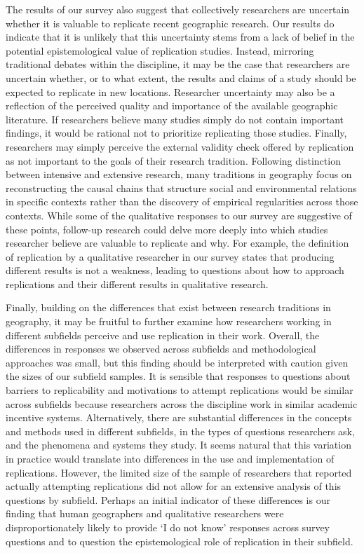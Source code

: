 \documentclass[]{interact}
\theoremstyle{plain}%
\theoremstyle{definition}
\theoremstyle{remark}
\begin{document}
The results of our survey also suggest that collectively researchers are uncertain whether it is valuable to replicate recent geographic research. 
Our results do indicate that it is unlikely that this uncertainty stems from a lack of belief in the potential epistemological value of replication studies.
Instead, mirroring traditional debates within the discipline, it may be the case that researchers are uncertain whether, or to what extent, the results and claims of a study should be expected to replicate in new locations. 
Researcher uncertainty may also be a reflection of the perceived quality and importance of the available geographic literature. 
If researchers believe many studies simply do not contain important findings, it would be rational not to prioritize replicating those studies.
Finally, researchers may simply perceive the external validity check offered by replication as not important to the goals of their research tradition. 
Following \citet{sayer1992method} distinction between intensive and extensive research, many traditions in geography focus on reconstructing the causal chains that structure social and environmental relations in specific contexts rather than the discovery of empirical regularities across those contexts. 
While some of the qualitative responses to our survey are suggestive of these points, follow-up research could delve more deeply into which studies researcher believe are valuable to replicate and why.
For example, the definition of replication by a qualitative researcher in our survey states that producing different results is not a weakness, leading to questions about how to approach replications and their different results in qualitative research.

Finally, building on the differences that exist between research traditions in geography, it may be fruitful to further examine how researchers working in different subfields perceive and use replication in their work. 
Overall, the differences in responses we observed across subfields and methodological approaches was small, but this finding should be interpreted with caution given the sizes of our subfield samples.
It is sensible that responses to questions about barriers to replicability and motivations to attempt replications would be similar across subfields because researchers across the discipline work in similar academic incentive systems.
Alternatively, there are substantial differences in the concepts and methods used in different subfields, in the types of questions researchers ask, and the phenomena and systems they study. 
It seems natural that this variation in practice would translate into differences in the use and implementation of replications. 
However, the limited size of the sample of researchers that reported actually attempting replications did not allow for an extensive analysis of this questions by subfield. 
Perhaps an initial indicator of these differences is our finding that human geographers and qualitative researchers were disproportionately likely to provide `I do not know' responses across survey questions and to question the epistemological role of replication in their subfield. 
\end{document}
